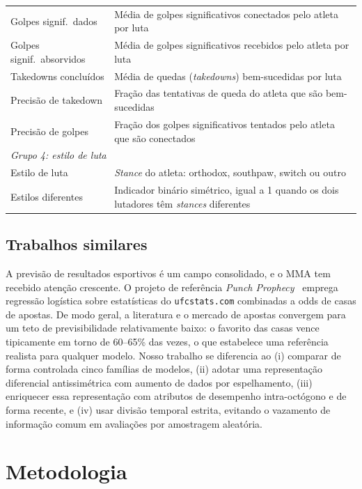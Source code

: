 \documentclass[10pt]{article}
\begin{document}
\begin{table}[t]
\begin{tabularx}{\textwidth}{l X}
\midrule
Golpes signif.\ dados & Média de golpes significativos conectados pelo atleta por luta \\
Golpes signif.\ absorvidos & Média de golpes significativos recebidos pelo atleta por luta \\
Takedowns concluídos & Média de quedas (\emph{takedowns}) bem-sucedidas por luta \\
Precisão de takedown & Fração das tentativas de queda do atleta que são bem-sucedidas \\
Precisão de golpes & Fração dos golpes significativos tentados pelo atleta que são conectados \\
\midrule
\multicolumn{2}{l}{\emph{Grupo 4: estilo de luta}} \\
\midrule
Estilo de luta & \emph{Stance} do atleta: orthodox, southpaw, switch ou outro \\
Estilos diferentes & Indicador binário simétrico, igual a 1 quando os dois lutadores têm \emph{stances} diferentes \\
\bottomrule
\end{tabularx}
\end{table}

\subsection{Trabalhos similares}
A previsão de resultados esportivos é um campo consolidado, e o MMA tem
recebido atenção crescente. O projeto de referência \emph{Punch
Prophecy}~\cite{punchprophecy} emprega regressão logística sobre estatísticas do
\texttt{ufcstats.com} combinadas a odds de casas de apostas. De modo geral, a
literatura e o mercado de apostas convergem para um teto de previsibilidade
relativamente baixo: o favorito das casas vence tipicamente em torno de
60--65\% das vezes, o que estabelece uma referência realista para qualquer
modelo. Nosso trabalho se diferencia ao (i) comparar de forma controlada cinco
famílias de modelos, (ii) adotar uma representação diferencial antissimétrica
com aumento de dados por espelhamento, (iii) enriquecer essa representação com
atributos de desempenho intra-octógono e de forma recente, e (iv) usar divisão
temporal estrita, evitando o vazamento de informação comum em avaliações por
amostragem aleatória.

\section{Metodologia}
\end{document}
